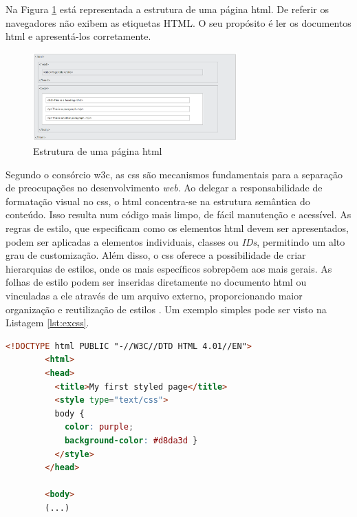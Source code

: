 Na Figura \ref{fig:estruturahtml} está representada a estrutura de uma página \acrshort{html}. De referir os navegadores não exibem as etiquetas HTML. O seu propósito é ler os documentos \acrshort{html} e apresentá-los corretamente.

\begin{figure}[hbtp]
    \centering
    \includegraphics[width=0.7\textwidth]{figures/html_page_structure.png}
    \caption{Estrutura de uma página \acrshort{html} \cite{HTMLbasics}}
    \label{fig:estruturahtml}
\end{figure}

Segundo o consórcio \gls{w3c}, as \acrshort{css} são mecanismos fundamentais para a separação de preocupações no desenvolvimento \textit{web}. Ao delegar a responsabilidade de formatação visual no \acrshort{css}, o \acrshort{html} concentra-se na estrutura semântica do conteúdo. Isso resulta num código mais limpo, de fácil manutenção e acessível. As regras de estilo, que especificam como os elementos \acrshort{html} devem ser apresentados, podem ser aplicadas a elementos individuais, classes ou \textit{IDs}, permitindo um alto grau de customização. Além disso, o \acrshort{css} oferece a possibilidade de criar hierarquias de estilos, onde os mais específicos sobrepõem aos mais gerais. As folhas de estilo podem ser inseridas diretamente no documento \acrshort{html} ou vinculadas a ele através de um arquivo externo, proporcionando maior organização e reutilização de estilos \cite{w3ccss}. Um exemplo simples pode ser visto na Listagem \ref{lst:excss}.

\begin{minipage}{0.9\linewidth}
    \begin{lstlisting}[language=HTML, caption=Exemplo \acrshort{css} incluído na página \acrshort{html} \cite{Startingcss}, label=lst:excss]
		<!DOCTYPE html PUBLIC "-//W3C//DTD HTML 4.01//EN">
		<html>
		<head>
		  <title>My first styled page</title>
		  <style type="text/css">
		  body {
			color: purple;
			background-color: #d8da3d }
		  </style>
		</head>
		
		<body>
		(...)
	\end{lstlisting}
\end{minipage}

